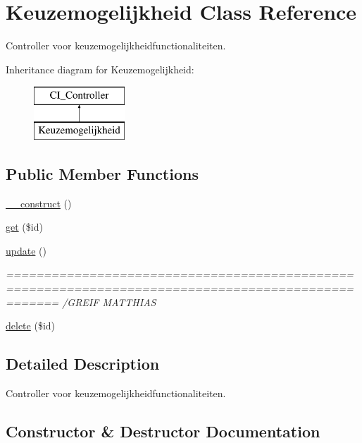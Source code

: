 \hypertarget{class_keuzemogelijkheid}{}\section{Keuzemogelijkheid Class Reference}
\label{class_keuzemogelijkheid}


Controller voor keuzemogelijkheidfunctionaliteiten.  


Inheritance diagram for Keuzemogelijkheid\+:\begin{figure}[H]
\begin{center}
\leavevmode
\includegraphics[height=2.000000cm]{class_keuzemogelijkheid}
\end{center}
\end{figure}
\subsection*{Public Member Functions}
\begin{DoxyCompactItemize}
\item 
\mbox{\hyperlink{class_keuzemogelijkheid_a095c5d389db211932136b53f25f39685}{\+\_\+\+\_\+construct}} ()
\item 
\mbox{\hyperlink{class_keuzemogelijkheid_a50e3bfb586b2f42932a6a93f3fbb0828}{get}} (\$id)
\item 
\mbox{\hyperlink{class_keuzemogelijkheid_a842e4774e3b3601a005b995c02f7e883}{update}} ()
\begin{DoxyCompactList}\small\item\em =================================================================================================== /\+G\+R\+E\+IF M\+A\+T\+T\+H\+I\+AS \end{DoxyCompactList}\item 
\mbox{\hyperlink{class_keuzemogelijkheid_a2f8258add505482d7f00ea26493a5723}{delete}} (\$id)
\end{DoxyCompactItemize}


\subsection{Detailed Description}
Controller voor keuzemogelijkheidfunctionaliteiten. 

\subsection{Constructor \& Destructor Documentation}
\mbox{\label{class_keuzemogelijkheid_a095c5d389db211932136b53f25f39685}} 
